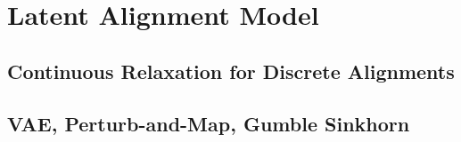 \section{Latent Alignment Model}
\label{sec:lex:latent-alignment}

\subsection{Continuous Relaxation for Discrete Alignments}
\label{ssec:lex:alignment-relax}


\subsection{VAE, Perturb-and-Map, Gumble Sinkhorn}
\label{ssec:lex:gumble-sinkhorn}



